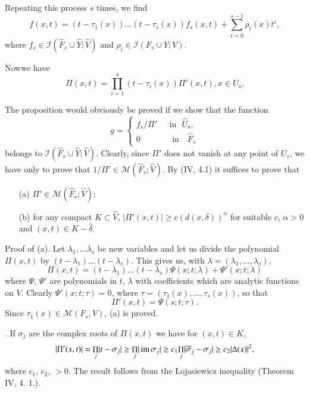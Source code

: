  Repeating this process $s$ times, we find
 $$
f(x, t) = (t - \tau_1 (x)) \ldots (t - \tau_s (x)) f_s (x,t) + \sum\limits^{s-1}_{i=0} \rho_i (x) t^i,
$$
where $f_s \in \mathscr{I} (\widehat{F}_s \cup \widehat{Y}; \widehat{V})$ and $\rho_i \in \mathscr{I} (F_s \cup Y ; V) $.

Now\pageoriginale we have
$$
\Pi (x,t) = \prod\limits^s_{i=1} (t - \tau_i (x)) \Pi' (x,t) , x \in U_s.
$$

The proposition would obviously be proved if we show that the function
$$
g = 
\begin{cases}
f_s  / \Pi'  & \text{~ in ~}  \widehat{U}_s,\\
0   & \text{ ~ in ~ }  \widehat{F}_s
\end{cases}
$$
belongs to $\mathscr{I}(\widehat{F}_s \cup \widehat{Y}; \widehat{V})$. Clearly, since $\Pi'$ does not vanish at any point of $U_s$, we have only to prove that $1/\Pi' \in \mathscr{M} (\widehat{F}_s; \widehat{V})$. By (IV, 4.1) it suffices to prove that
\begin{itemize}
\item[(a)] $\Pi' \in \mathscr{M} (\widehat{F}_s ; \widehat{V})$;

\item[(b)] for any compact $K \subset \widehat{V}$, $|\Pi' (x,t)| \geq c (d (x,\delta))^\alpha$ for suitable $c$, $\alpha >0$ and $(x,t) \in  K - \widehat{\delta}$.
 
\end{itemize}

\medskip
\noindent
Proof of (a).  Let $\lambda_1, \ldots \lambda_s$ be new variables and let us divide the polynomial $\Pi (x,t)$ by $(t - \lambda_1) \ldots (t - \lambda_s)$. This gives us, with $\lambda = (\lambda_1, \ldots, \lambda_s)$,
$$
\Pi (x,t) = (t - \lambda_1) \ldots (t - \lambda_s) \Psi (x; t; \lambda) + \Psi' (x; t; \lambda)
$$
where $\Psi$, $\Psi'$ are polynomials in $t$, $\lambda$ with coefficients which are analytic functions on $V$. Clearly $\Psi' (x; t; \tau) =0$, where $\tau = (\tau_1 (x), \ldots, \tau_s (x))$, so that
$$
\Pi' (x, t) = \Psi (s; t; \tau).
$$
Since $\tau_1 (x) \in \mathscr{M} (F_s, V)$, (a) is proved.

\medskip
{}. If $\sigma_j$ are the complex roots of $\Pi (x,t)$ we have for $(x,t) \in K$,
$$
|\Pi' (x, t)| = {\displaystyle\mathop{\Pi}_j}  |t - \sigma_j| \geq {\displaystyle\mathop{\Pi}_j}  |\operatorname{im} \sigma_j| \geq c_1  {\displaystyle\mathop{\Pi}_j} |\overline{\sigma}_j - \sigma_j|  \geq c_2 |\Delta (x)|^2,
$$
where $c_1$, $c_2$, $>0$. The result follows from the {\L}ojasiewicz inequality (Theorem IV, 4. 1.).

